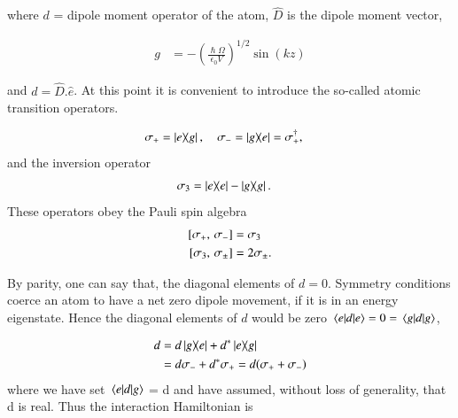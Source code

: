 where $ d $ = dipole moment operator of the atom, $\hat{D}$ is the dipole moment vector,%

\begin{align}\label{eq:5}
g &= -{ \left( \frac { \hslash \Omega  }{ { \epsilon  }_{ 0 }V }  \right)  }^{ { 1 }/{ 2 } } \sin { \left( kz \right) }
\end{align}

and  $ d = \hat{D}. \hat{e}$. At this point it is convenient to introduce the so-called atomic transition
operators.


\begin{align}\label{eq:7}
\sigma_{+}&=\dyad{e}{g},\quad \sigma_{-}= \dyad{g}{e}=\sigma_{+}^{ \dagger  },
\end{align}
and the inversion operator 
\begin{align}\label{eq:8}
\sigma_{3}&=\dyad{e}-\dyad{g}.
\end{align}
These operators obey the Pauli spin algebra
\begin{align}\label{eq:9}
[\sigma_{+},\thinspace\sigma_{-}] &=\sigma_{3}\\ %
[\sigma_{3},\thinspace\sigma_{\pm}] &=2\sigma_{\pm}.
\end{align}

By parity, one can say that, the diagonal elements of ${d} = {0}$. Symmetry conditions coerce an atom to have a net zero dipole movement, if it is in an energy eigenstate. Hence the diagonal elements of ${d}$  would be zero $\expval{d}{e} = 0 = \expval{d}{g} $, 

\begin{align}\label{eq:9.1}
\begin{split}
d&= d\dyad{g}{e}+{d}^{*}\dyad{e}{g}\\ 
&=d\sigma_{-} + d^{*}\sigma_{+} = d(\sigma_{+} + \sigma_{-}) 
\end{split}
\end{align}
where we have set $\mel{e}{d}{g}$ = d and have assumed, without loss of generality, that d is real. Thus the interaction Hamiltonian is %

